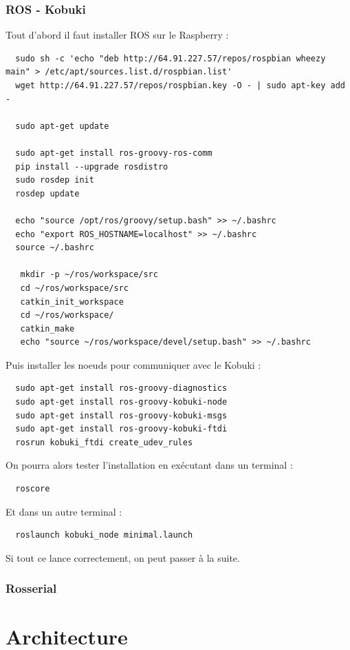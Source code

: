 \documentclass[a4paper, 11pt]{article}
\begin{document}
\subsubsection{ROS - Kobuki}
Tout d'abord il faut installer ROS sur le Raspberry : 
\begin{lstlisting}
  sudo sh -c 'echo "deb http://64.91.227.57/repos/rospbian wheezy main" > /etc/apt/sources.list.d/rospbian.list'
  wget http://64.91.227.57/repos/rospbian.key -O - | sudo apt-key add -

  sudo apt-get update

  sudo apt-get install ros-groovy-ros-comm
  pip install --upgrade rosdistro
  sudo rosdep init
  rosdep update

  echo "source /opt/ros/groovy/setup.bash" >> ~/.bashrc
  echo "export ROS_HOSTNAME=localhost" >> ~/.bashrc
  source ~/.bashrc

   mkdir -p ~/ros/workspace/src
   cd ~/ros/workspace/src
   catkin_init_workspace
   cd ~/ros/workspace/
   catkin_make
   echo "source ~/ros/workspace/devel/setup.bash" >> ~/.bashrc
\end{lstlisting}
Puis installer les noeuds pour communiquer avec le Kobuki : 
\begin{lstlisting}
  sudo apt-get install ros-groovy-diagnostics
  sudo apt-get install ros-groovy-kobuki-node 
  sudo apt-get install ros-groovy-kobuki-msgs
  sudo apt-get install ros-groovy-kobuki-ftdi
  rosrun kobuki_ftdi create_udev_rules
\end{lstlisting}
On pourra alors tester l'installation en exécutant dans un terminal :
\begin{verbatim}
  roscore
\end{verbatim}
Et dans un autre terminal : 
\begin{verbatim}
  roslaunch kobuki_node minimal.launch
\end{verbatim}
Si tout ce lance correctement, on peut passer à la suite.
\subsubsection{Rosserial}
  
\section{Architecture}
\end{document}
